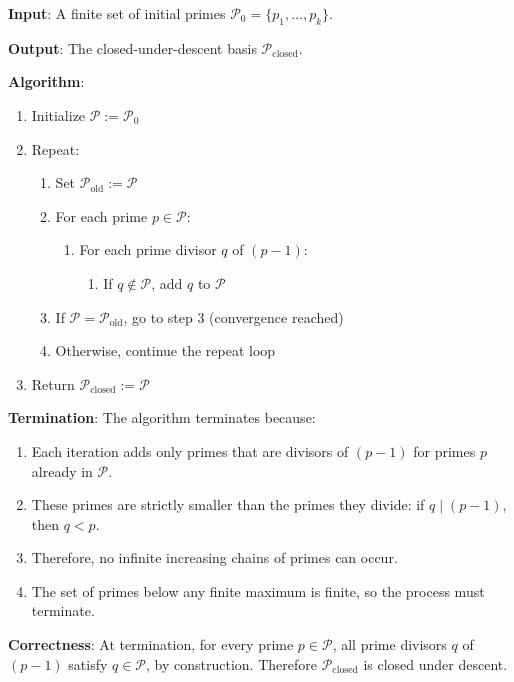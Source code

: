 \begin{lemma}
\label{lem:construction-descent-closure}

\noindent \textbf{Input}: A finite set of initial primes $\mathcal{P}_0 = \{p_1, \ldots, p_k\}$.

\noindent \textbf{Output}: The closed-under-descent basis $\mathcal{P}_{\text{closed}}$.

\noindent \textbf{Algorithm}:
\begin{enumerate}
\item Initialize $\mathcal{P} := \mathcal{P}_0$
\item Repeat:
\begin{enumerate}
\item Set $\mathcal{P}_{\text{old}} := \mathcal{P}$
\item For each prime $p \in \mathcal{P}$:
\begin{enumerate}
\item For each prime divisor $q$ of $(p-1)$:
\begin{enumerate}
\item If $q \notin \mathcal{P}$, add $q$ to $\mathcal{P}$
\end{enumerate}
\end{enumerate}
\item If $\mathcal{P} = \mathcal{P}_{\text{old}}$, go to step 3 (convergence reached)
\item Otherwise, continue the repeat loop
\end{enumerate}
\item Return $\mathcal{P}_{\text{closed}} := \mathcal{P}$
\end{enumerate}

\noindent \textbf{Termination}: The algorithm terminates because:
\begin{enumerate}
\item Each iteration adds only primes that are divisors of $(p-1)$ for primes $p$ already in $\mathcal{P}$.
\item These primes are strictly smaller than the primes they divide: if $q \mid (p-1)$, then $q < p$.
\item Therefore, no infinite increasing chains of primes can occur.
\item The set of primes below any finite maximum is finite, so the process must terminate.
\end{enumerate}

\noindent \textbf{Correctness}: At termination, for every prime $p \in \mathcal{P}$, all prime divisors $q$ of $(p-1)$ satisfy $q \in \mathcal{P}$, by construction. Therefore $\mathcal{P}_{\text{closed}}$ is closed under descent.

\end{lemma}

